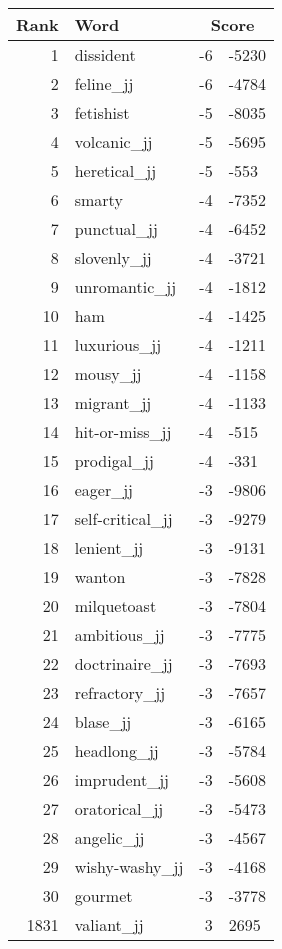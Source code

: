 \begin{longtable}[!htbp]{| rlr@{.}l |}
    \hline
    \textbf{Rank} & \textbf{Word} & \multicolumn{2}{c|}{\textbf{Score}} \\
    \hline
    \endhead
    1 & dissident & -6 & -5230 \\
    2 & feline\_jj & -6 & -4784 \\
    3 & fetishist & -5 & -8035 \\
    4 & volcanic\_jj & -5 & -5695 \\
    5 & heretical\_jj & -5 & -553 \\
    6 & smarty & -4 & -7352 \\
    7 & punctual\_jj & -4 & -6452 \\
    8 & slovenly\_jj & -4 & -3721 \\
    9 & unromantic\_jj & -4 & -1812 \\
    10 & ham & -4 & -1425 \\
    11 & luxurious\_jj & -4 & -1211 \\
    12 & mousy\_jj & -4 & -1158 \\
    13 & migrant\_jj & -4 & -1133 \\
    14 & hit-or-miss\_jj & -4 & -515 \\
    15 & prodigal\_jj & -4 & -331 \\
    16 & eager\_jj & -3 & -9806 \\
    17 & self-critical\_jj & -3 & -9279 \\
    18 & lenient\_jj & -3 & -9131 \\
    19 & wanton & -3 & -7828 \\
    20 & milquetoast & -3 & -7804 \\
    21 & ambitious\_jj & -3 & -7775 \\
    22 & doctrinaire\_jj & -3 & -7693 \\
    23 & refractory\_jj & -3 & -7657 \\
    24 & blase\_jj & -3 & -6165 \\
    25 & headlong\_jj & -3 & -5784 \\
    26 & imprudent\_jj & -3 & -5608 \\
    27 & oratorical\_jj & -3 & -5473 \\
    28 & angelic\_jj & -3 & -4567 \\
    29 & wishy-washy\_jj & -3 & -4168 \\
    30 & gourmet & -3 & -3778 \\
    1831 & valiant\_jj & 3 & 2695 \\

\end{longtable}
